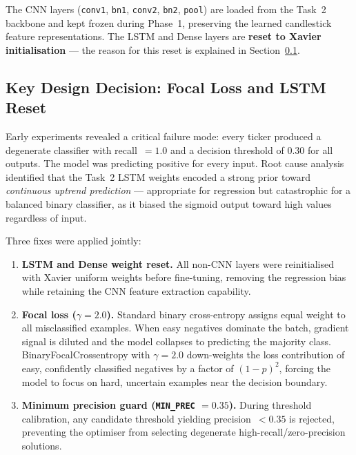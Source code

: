 \documentclass[12pt, a4paper]{article}
\begin{document}
The CNN layers (\texttt{conv1}, \texttt{bn1}, \texttt{conv2},
\texttt{bn2}, \texttt{pool}) are loaded from the Task~2 backbone
and kept frozen during Phase~1, preserving the learned candlestick
feature representations. The LSTM and Dense layers are \textbf{reset
to Xavier initialisation} --- the reason for this reset is explained
in Section~\ref{sec:t3_design}.

\subsection{Key Design Decision: Focal Loss and LSTM Reset}
\label{sec:t3_design}

Early experiments revealed a critical failure mode: every ticker
produced a degenerate classifier with recall~$= 1.0$ and a decision
threshold of 0.30 for all outputs. The model was predicting positive
for every input. Root cause analysis identified that the Task~2 LSTM
weights encoded a strong prior toward \emph{continuous uptrend
prediction} --- appropriate for regression but catastrophic for a
balanced binary classifier, as it biased the sigmoid output toward
high values regardless of input.

Three fixes were applied jointly:

\begin{enumerate}
  \item \textbf{LSTM and Dense weight reset.} All non-CNN layers were
    reinitialised with Xavier uniform weights before fine-tuning,
    removing the regression bias while retaining the CNN feature
    extraction capability.

  \item \textbf{Focal loss ($\gamma = 2.0$).}
    Standard binary cross-entropy assigns equal weight to all
    misclassified examples. When easy negatives dominate the batch,
    gradient signal is diluted and the model collapses to predicting
    the majority class. BinaryFocalCrossentropy with $\gamma = 2.0$
    down-weights the loss contribution of easy, confidently classified
    negatives by a factor of $(1-p)^2$, forcing the model to focus
    on hard, uncertain examples near the decision boundary.

  \item \textbf{Minimum precision guard (\texttt{MIN\_PREC} $= 0.35$).}
    During threshold calibration, any candidate threshold yielding
    precision~$< 0.35$ is rejected, preventing the optimiser from
    selecting degenerate high-recall/zero-precision solutions.
\end{enumerate}
\end{document}
